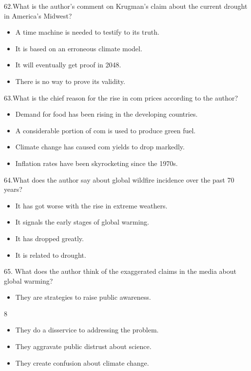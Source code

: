 \documentclass[UTF8,11pt]{ctexart}
\begin{document}
62.What is the author’s comment on Krugman’s claim about the current drought in America’s Midwest?


\begin{itemize}[leftmargin=2em,itemsep=.2em,topsep=.4em]\item[A.] A time machine is needed to testify to its truth.
\item[B.] It is based on an erroneous climate model.
\item[C.] It will eventually get proof in 2048.
\item[D.] There is no way to prove its validity.
\end{itemize}

63.What is the chief reason for the rise in com prices according to the author?


\begin{itemize}[leftmargin=2em,itemsep=.2em,topsep=.4em]\item[A.] Demand for food has been rising in the developing countries.
\item[B.] A considerable portion of com is used to produce green fuel.
\item[C.] Climate change has caused com yields to drop markedly.
\item[D.] Inflation rates have been skyrocketing since the 1970s.
\end{itemize}

64.What does the author say about global wildfire incidence over the past 70 years?


\begin{itemize}[leftmargin=2em,itemsep=.2em,topsep=.4em]\item[A.] It has got worse with the rise in extreme weathers.
\item[B.] It signals the early stages of global warming.
\item[C.] It has dropped greatly.
\item[D.] It is related to drought.
\end{itemize}

65. What does the author think of the exaggerated claims in the media about global warming?


\begin{itemize}[leftmargin=2em,itemsep=.2em,topsep=.4em]\item[A.] They are strategies to raise public awareness.
\end{itemize}

8


\begin{itemize}[leftmargin=2em,itemsep=.2em,topsep=.4em]\item[B.] They do a disservice to addressing the problem.
\item[C.] They aggravate public distrust about science.
\item[D.] They create confusion about climate change.
\end{itemize}
\end{document}
